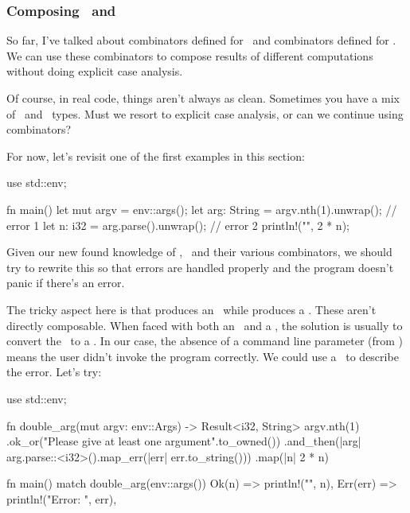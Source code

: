 \subsubsection*{Composing \option\ and \result}

So far, I've talked about combinators defined for \option\ and combinators defined for \result. We can use 
these combinators to compose results of different computations without doing explicit case analysis.

\blank

Of course, in real code, things aren't always as clean. Sometimes you have a mix of \option\ and \result\ types. 
Must we resort to explicit case analysis, or can we continue using combinators?

\blank

For now, let's revisit one of the first examples in this section:

\begin{rustc}
use std::env;

fn main() {
    let mut argv = env::args();
    let arg: String = argv.nth(1).unwrap(); // error 1
    let n: i32 = arg.parse().unwrap(); // error 2
    println!("{}", 2 * n);
}
\end{rustc}

Given our new found knowledge of \option, \result\ and their various combinators, we should try to rewrite this so that 
errors are handled properly and the program doesn't panic if there's an error.

\blank

The tricky aspect here is that  produces an \option\ while  produces a \result. These 
aren't directly composable. When faced with both an \option\ and a \result, the solution is usually to convert the \option\ 
to a \result. In our case, the absence of a command line parameter (from ) means the user didn't invoke 
the program correctly. We could use a \String\ to describe the error. Let's try:

\begin{rustc}
use std::env;

fn double_arg(mut argv: env::Args) -> Result<i32, String> {
    argv.nth(1)
        .ok_or("Please give at least one argument".to_owned())
        .and_then(|arg| arg.parse::<i32>().map_err(|err| err.to_string()))
        .map(|n| 2 * n)
}

fn main() {
    match double_arg(env::args()) {
        Ok(n) => println!("{}", n),
        Err(err) => println!("Error: {}", err),
    }
}
\end{rustc}

